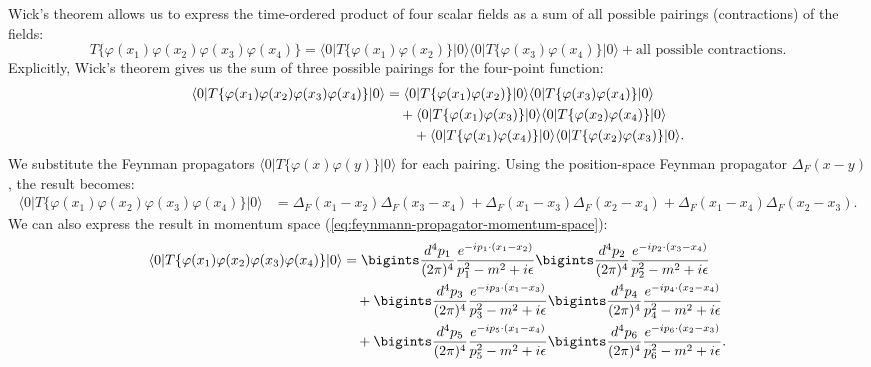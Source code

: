 Wick's theorem allows us to express the time-ordered product of four scalar fields as a sum of all possible pairings (contractions) of the fields:
\[
T \{ \varphi(x_1) \varphi(x_2) \varphi(x_3) \varphi(x_4) \} = \langle 0 | T \{ \varphi(x_1) \varphi(x_2) \} | 0 \rangle \langle 0 | T \{ \varphi(x_3) \varphi(x_4) \} | 0 \rangle + \text{all possible contractions}.
\]
Explicitly, Wick's theorem gives us the sum of three possible pairings for the four-point function:
\begin{align}
    \langle 0 | T \{ \varphi(x_1) \varphi(x_2) \varphi(x_3) \varphi(x_4) \} | 0 \rangle &= \langle 0 | T \{ \varphi(x_1) \varphi(x_2) \} | 0 \rangle \langle 0 | T \{ \varphi(x_3) \varphi(x_4) \} | 0 \rangle \notag\\
    &\hspace{10pt}+ \langle 0 | T \{ \varphi(x_1) \varphi(x_3) \} | 0 \rangle \langle 0 | T \{ \varphi(x_2) \varphi(x_4) \} | 0 \rangle \notag \\
    &\hspace{20pt} + \langle 0 | T \{ \varphi(x_1) \varphi(x_4) \} | 0 \rangle \langle 0 | T \{ \varphi(x_2) \varphi(x_3) \} | 0 \rangle.
\end{align}
We substitute the Feynman propagators $\langle 0 | T \{ \varphi(x) \varphi(y) \} | 0 \rangle$ for each pairing. Using the position-space Feynman propagator $\Delta_F(x - y)$, the result becomes:
\begin{align}
    \langle 0 | T \{ \varphi(x_1) \varphi(x_2) \varphi(x_3) \varphi(x_4) \} | 0 \rangle &= \Delta_F(x_1 - x_2) \Delta_F(x_3 - x_4) + \Delta_F(x_1 - x_3) \Delta_F(x_2 - x_4) + \Delta_F(x_1 - x_4) \Delta_F(x_2 - x_3).
\end{align}
We can also express the result in momentum space (\ref{eq:feynmann-propagator-momentum-space}):
\begin{align}
    \langle 0 | T \{ \varphi(x_1) \varphi(x_2) \varphi(x_3) \varphi(x_4) \} | 0 \rangle &= \bigints \frac{d^4 p_1}{(2\pi)^4} \frac{e^{-ip_1 \cdot (x_1 - x_2)}}{p_1^2 - m^2 + i\epsilon} \bigints \frac{d^4 p_2}{(2\pi)^4} \frac{e^{-ip_2 \cdot (x_3 - x_4)}}{p_2^2 - m^2 + i\epsilon} \notag \\
    &\quad + \bigints \frac{d^4 p_3}{(2\pi)^4} \frac{e^{-ip_3 \cdot (x_1 - x_3)}}{p_3^2 - m^2 + i\epsilon} \bigints \frac{d^4 p_4}{(2\pi)^4} \frac{e^{-ip_4 \cdot (x_2 - x_4)}}{p_4^2 - m^2 + i\epsilon} \notag \\
    &\quad + \bigints \frac{d^4 p_5}{(2\pi)^4} \frac{e^{-ip_5 \cdot (x_1 - x_4)}}{p_5^2 - m^2 + i\epsilon} \bigints \frac{d^4 p_6}{(2\pi)^4} \frac{e^{-ip_6 \cdot (x_2 - x_3)}}{p_6^2 - m^2 + i\epsilon}.
\end{align}
\bigskip\bigskip\hline\hline\bigskip